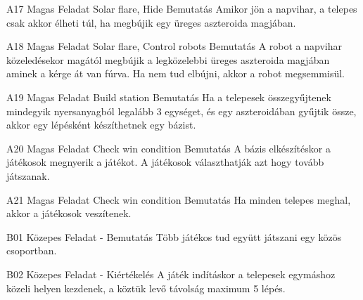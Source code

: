 \documentclass[../../projlab]{subfiles}
\begin{document}
\begin{funkovetelmeny}
	{A17}
	{Magas}
	{Feladat}
	{Solar flare, Hide}
	{Bemutatás}
	{Amikor jön a napvihar, a telepes csak akkor élheti túl, ha megbújik egy üreges aszteroida magjában. }
    
\end{funkovetelmeny}

\begin{funkovetelmeny}
	{A18}
	{Magas}
	{Feladat}
	{Solar flare, Control robots}
	{Bemutatás}
	{A robot a napvihar közeledésekor magától megbújik a legközelebbi üreges aszteroida magjában aminek a kérge át van fúrva. Ha nem tud elbújni, akkor a robot megsemmisül. }

\end{funkovetelmeny}

\begin{funkovetelmeny}
	{A19}
	{Magas}
	{Feladat}
	{Build station}
	{Bemutatás}
	{Ha a telepesek összegyűjtenek mindegyik nyersanyagból legalább 3 egységet, és egy aszteroidában gyűjtik össze, akkor egy lépésként készíthetnek egy bázist.}
    
\end{funkovetelmeny}

\begin{funkovetelmeny}
	{A20}
	{Magas}
	{Feladat}
	{Check win condition}
	{Bemutatás}
	{A bázis elkészítéskor a játékosok megnyerik a játékot.}
    A játékosok választhatják azt hogy tovább játszanak.
\end{funkovetelmeny}

\begin{funkovetelmeny}
	{A21}
	{Magas}
	{Feladat}
	{Check win condition}
	{Bemutatás}
	{Ha minden telepes meghal, akkor a játékosok veszítenek.}
    
\end{funkovetelmeny}

\begin{funkovetelmeny}
	{B01}
	{Közepes}
	{Feladat}
	{-}
	{Bemutatás}
	{Több játékos tud együtt játszani egy közös csoportban.}
    
\end{funkovetelmeny}

\begin{funkovetelmeny}
	{B02}
	{Közepes}
	{Feladat}
	{-}
	{Kiértékelés}
	{A játék indításkor a telepesek egymáshoz közeli helyen kezdenek, a köztük levő távolság maximum 5 lépés.}
    
\end{funkovetelmeny}
\end{document}
